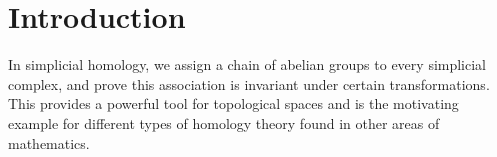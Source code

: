 \section{Introduction}
In simplicial homology, we assign a chain of abelian groups to every simplicial complex, and prove this association is invariant under certain transformations. This provides a powerful tool for topological spaces and is the motivating example for different types of homology theory found in other areas of mathematics.
